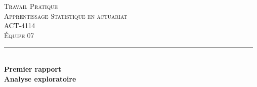 ﻿%
%
%

\begin{titlepage}

\newcommand{\HRule}{\rule{\linewidth}{0.5mm}} %

\center %
\textsc{\LARGE Travail Pratique}\\[1.0cm] %
\textsc{\Large Apprentissage Statistique en actuariat}\\[0.2cm] %
\textsc{\large ACT-4114}\\[0.7cm] %
\textsc{\large Équipe 07}\\[0.7cm] %


\HRule \\[0.4cm]
{ \Large \bfseries Premier rapport}\\[0.20cm] { \huge \bfseries Analyse exploratoire}\\[0.20cm]


\end{titlepage}
